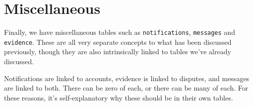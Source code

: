 \section{Miscellaneous}

Finally, we have miscellaneous tables such as \lstinline{notifications}, \lstinline{messages} and \lstinline{evidence}. These are all very separate concepts to what has been discussed previously, though they are also intrinsically linked to tables we've already discussed.

Notifications are linked to accounts, evidence is linked to disputes, and messages are linked to both. There can be zero of each, or there can be many of each. For these reasons, it's self-explanatory why these should be in their own tables.